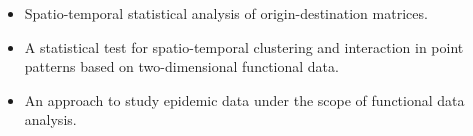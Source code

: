 \documentclass[11pt, a4paper]{awesome-cv}
\begin{document}
\begin{cvletter}
\begin{itemize}
    \item Spatio-temporal statistical analysis of origin-destination matrices.
    \item A statistical test for spatio-temporal clustering and interaction in point patterns based on two-dimensional functional data.
    \item An approach to study epidemic data under the scope of functional data analysis.
\end{itemize}
\end{cvletter}


\end{document}
